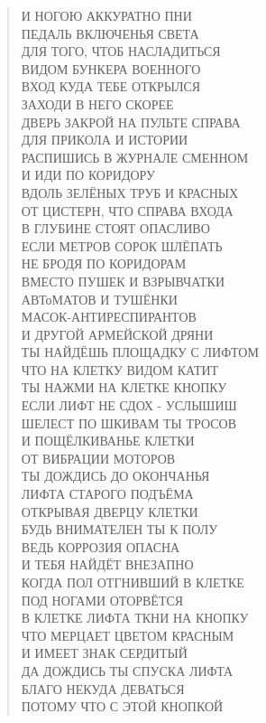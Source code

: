 \begin{verse}
И НОГОЮ АККУРАТНО ПНИ \\
ПЕДАЛЬ ВКЛЮЧЕНЬЯ СВЕТА\\
ДЛЯ ТОГО, ЧТОБ НАСЛАДИТЬСЯ\\
ВИДОМ БУНКЕРА ВОЕННОГО\\
ВХОД КУДА ТЕБЕ ОТКРЫЛСЯ\\
ЗАХОДИ В НЕГО СКОРЕЕ\\
ДВЕРЬ ЗАКРОЙ НА ПУЛЬТЕ СПРАВА\\
ДЛЯ ПРИКОЛА И ИСТОРИИ\\
РАСПИШИСЬ В ЖУРНАЛЕ СМЕННОМ\\
И ИДИ ПО КОРИДОРУ\\
ВДОЛЬ ЗЕЛЁНЫХ ТРУБ И КРАСНЫХ\\
ОТ ЦИСТЕРН, ЧТО СПРАВА ВХОДА\\
В ГЛУБИНЕ СТОЯТ ОПАСЛИВО\\
ЕСЛИ МЕТРОВ СОРОК ШЛЁПАТЬ\\
НЕ БРОДЯ ПО КОРИДОРАМ\\
ВМЕСТО ПУШЕК И ВЗРЫВЧАТКИ\\
АВТоМАТОВ И ТУШЁНКИ\\
МАСОК-АНТИРЕСПИРАНТОВ\\
И ДРУГОЙ АРМЕЙСКОЙ ДРЯНИ\\
ТЫ НАЙДЁШЬ ПЛОЩАДКУ С ЛИФТОМ\\
ЧТО НА КЛЕТКУ ВИДОМ КАТИТ\\
ТЫ НАЖМИ НА КЛЕТКЕ КНОПКУ\\
ЕСЛИ ЛИФТ НЕ СДОХ - УСЛЫШИШ\\
ШЕЛЕСТ ПО ШКИВАМ ТЫ ТРОСОВ\\
И ПОЩЁЛКИВАНЬЕ КЛЕТКИ\\
ОТ ВИБРАЦИИ МОТОРОВ\\
ТЫ ДОЖДИСЬ ДО ОКОНЧАНЬЯ\\
ЛИФТА СТАРОГО ПОДЪЁМА\\
ОТКРЫВАЯ ДВЕРЦУ КЛЕТКИ\\
БУДЬ ВНИМАТЕЛЕН ТЫ К ПОЛУ\\
ВЕДЬ КОРРОЗИЯ ОПАСНА \\
И ТЕБЯ НАЙДЁТ ВНЕЗАПНО\\
КОГДА ПОЛ ОТГНИВШИЙ В КЛЕТКЕ\\
ПОД НОГАМИ ОТОРВЁТСЯ\\
В КЛЕТКЕ ЛИФТА ТКНИ НА КНОПКУ\\
ЧТО МЕРЦАЕТ ЦВЕТОМ КРАСНЫМ\\
И ИМЕЕТ ЗНАК СЕРДИТЫЙ\\
ДА ДОЖДИСЬ ТЫ СПУСКА ЛИФТА\\
БЛАГО НЕКУДА ДЕВАТЬСЯ\\
ПОТОМУ ЧТО С ЭТОЙ КНОПКОЙ \\

\end{verse}
